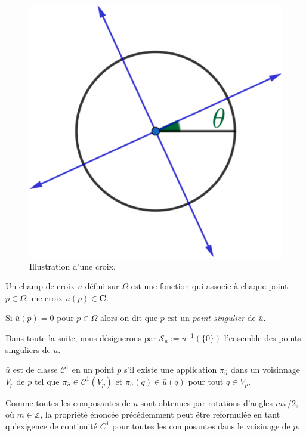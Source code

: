 \begin{figure}[!h]
  \centering
  \includegraphics[scale=0.5]{images/cross.pdf}
  \caption{Illustration d'une croix.}
  \label{fig:croix}
\end{figure}

Un champ de croix $\bar{u}$ défini sur $\Omega$ est une fonction qui associe à chaque point $p\in\Omega$ une croix $\bar{u}(p)\in\mathbf{C}$.

\begin{definition}
    Si $\bar{u}(p)=0$ pour $p\in\Omega$ alors on dit que $p$ est un \emph{point singulier} de $\bar{u}$.
\end{definition}

Dans toute la suite, nous désignerons par  $\mathcal{S}_{\bar{u}}:={\bar{u}}^{-1}(\{0\})$ l'ensemble des points singuliers de $\bar{u}$.

\begin{definition}%
\label{def:cont}
$\bar{u}$ est de classe $\mathcal{C}^1$ en un point $p$ s'il existe une application $\pi_{\bar{u}}$ dans un voisinnage $V_p$ de $p$ tel que $\pi_{\bar{u}}\in\mathcal{C}^1(V_p)$ et $\pi_{\bar{u}}(q)\in\bar{u}(q)$ pour tout $q\in V_p$.
\end{definition}

Comme toutes les composantes de $\bar{u}$ sont obtenues par rotations d'angles $m\pi/2$, où $m\in\mathbb{Z}$, la propriété énoncée précédemment peut être reformulée en tant qu'exigence de continuité $C^1$ pour toutes les composantes dans le voisinage de $p$.

